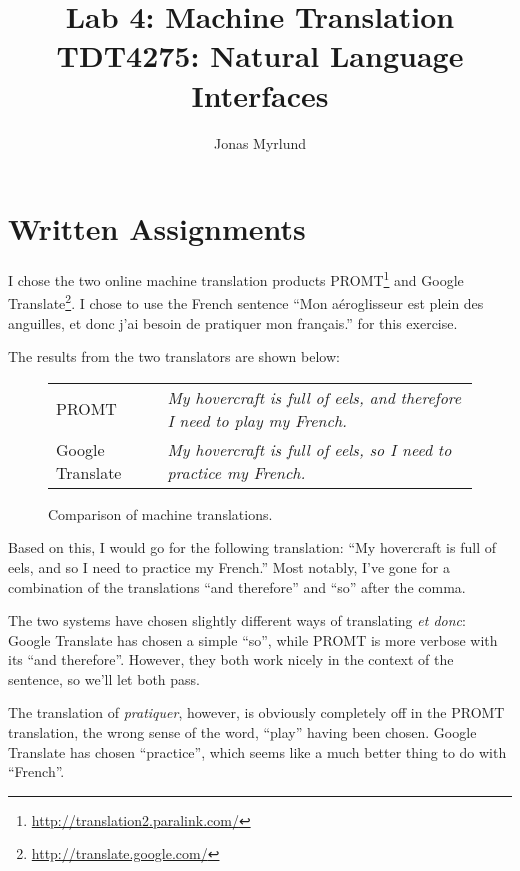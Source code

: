 \documentclass[11pt,a4paper]{article}
\begin{document}
  \title{Lab 4: Machine Translation \\ \large{TDT4275: Natural Language Interfaces}}
  \author{Jonas Myrlund}

  \maketitle

  \section{Written Assignments} %
  \label{sec:written_assignments}

    I chose the two online machine translation products PROMT\footnote{\url{http://translation2.paralink.com/}} and Google Translate\footnote{\url{http://translate.google.com/}}.
    I chose to use the French sentence ``Mon aéroglisseur est plein des anguilles, et donc j'ai besoin de pratiquer mon français.'' for this exercise.

    The results from the two translators are shown below:

    \begin{figure}[h!]
      \begin{tabular}{ll}
         PROMT & \emph{My hovercraft is full of eels, and therefore I need to play my French.} \\
         Google Translate & \emph{My hovercraft is full of eels, so I need to practice my French.}
      \end{tabular}
      \caption{Comparison of machine translations.}
    \end{figure}

    Based on this, I would go for the following translation: ``My hovercraft is full of eels, and so I need to practice my French.''
    Most notably, I've gone for a combination of the translations ``and therefore'' and ``so'' after the comma.

    The two systems have chosen slightly different ways of translating \emph{et donc}:
    Google Translate has chosen a simple ``so'', while PROMT is more verbose with its ``and therefore''.
    However, they both work nicely in the context of the sentence, so we'll let both pass.

    The translation of \emph{pratiquer}, however, is obviously completely off in the PROMT translation, the wrong sense of the word, ``play'' having been chosen.
    Google Translate has chosen ``practice'', which seems like a much better thing to do with ``French''.
\end{document}
